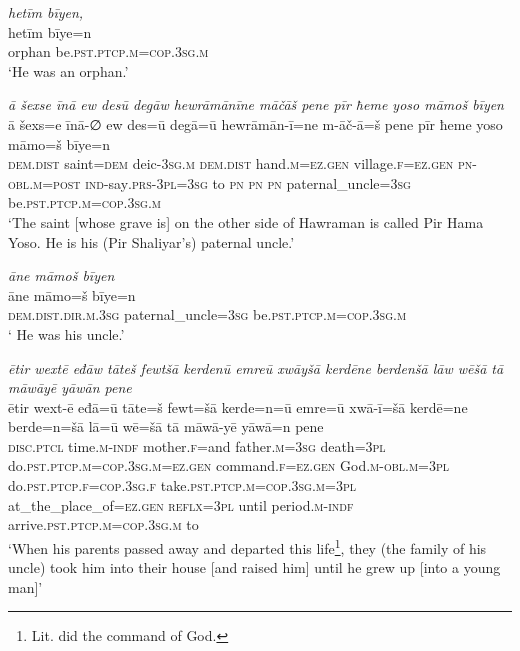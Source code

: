 \ea \label{ZP.5}
\textit{hetīm bīyen,} \\ 
\gll hetīm bīye=n \\ 
 orphan be\textsc{.pst}\textsc{.ptcp}\textsc{.m}\textsc{=cop}\textsc{.3sg}\textsc{.m} \\ 
\glt `He was an orphan.'
\z 
 
\ea \label{ZP.6}
\textit{ā šexse īnā ew desū degāw hewrāmānīne māčāš pene pīr ħeme yoso māmoš bīyen} \\ 
\gll ā šexs=e īnā-∅ ew des=ū degā=ū hewrāmān-ī=ne m-āč-ā=š pene pīr ħeme yoso māmo=š bīye=n \\ 
 \textsc{dem.dist} saint\textsc{=dem} deic\textsc{-3sg}\textsc{.m} \textsc{dem.dist} hand\textsc{.m}\textsc{\textsc{=ez.gen}} village\textsc{.f}\textsc{\textsc{=ez.gen}} \textsc{pn}\textsc{-obl}\textsc{.m}\textsc{=\textsc{post}} \textsc{ind-}say\textsc{.prs}\textsc{-3pl}\textsc{=3sg} to \textsc{pn} \textsc{pn} \textsc{pn} paternal\_uncle\textsc{=3sg} be\textsc{.pst}\textsc{.ptcp}\textsc{.m}\textsc{=cop}\textsc{.3sg}\textsc{.m} \\ 
\glt `The saint [whose grave is] on the other side of Hawraman is called Pir Hama Yoso. He is his (Pir Shaliyar’s) paternal uncle.'
\z 
 
\ea \label{ZP.7}
\textit{āne māmoš bīyen} \\ 
\gll āne māmo=š bīye=n \\ 
 \textsc{dem.dist}\textsc{.dir}\textsc{.m}\textsc{.3sg} paternal\_uncle\textsc{=3sg} be\textsc{.pst}\textsc{.ptcp}\textsc{.m}\textsc{=cop}\textsc{.3sg}\textsc{.m} \\ 
\glt ` He was his uncle.'
\z 
 
\ea \label{ZP.8}
\textit{ētir wextē eđāw tāteš fewtšā kerdenū emreū xwāyšā kerdēne berdenšā lāw wēšā tā māwāyē yāwān pene} \\ 
\gll ētir wext-ē eđā=ū tāte=š fewt=šā kerde=n=ū emre=ū xwā-ī=šā kerdē=ne berde=n=šā lā=ū wē=šā tā māwā-yē yāwā=n pene \\ 
 \textsc{disc.ptcl} time\textsc{.m}\textsc{-indf} mother\textsc{.f}=and father\textsc{.m}\textsc{=3sg} death\textsc{=3pl} do\textsc{.pst}\textsc{.ptcp}\textsc{.m}\textsc{=cop}\textsc{.3sg}\textsc{.m}\textsc{\textsc{=ez.gen}} command\textsc{.f}\textsc{\textsc{=ez.gen}} God\textsc{.m}\textsc{-obl}\textsc{.m}\textsc{=3pl} do\textsc{.pst}\textsc{.ptcp}\textsc{.f}\textsc{=cop}\textsc{.3sg}\textsc{.f} take\textsc{.pst}\textsc{.ptcp}\textsc{.m}\textsc{=cop}\textsc{.3sg}\textsc{.m}\textsc{=3pl} at\_the\_place\_of\textsc{\textsc{=ez.gen}} \textsc{reflx}\textsc{=3pl} until period\textsc{.m}\textsc{-indf} arrive\textsc{.pst}\textsc{.ptcp}\textsc{.m}\textsc{=cop}\textsc{.3sg}\textsc{.m} to \\ 
\glt `When his parents passed away and departed this life\footnote{Lit. did the command of God.}, they (the family of his uncle) took him into their house [and raised him] until he grew up [into a young man]'
\z 
 
